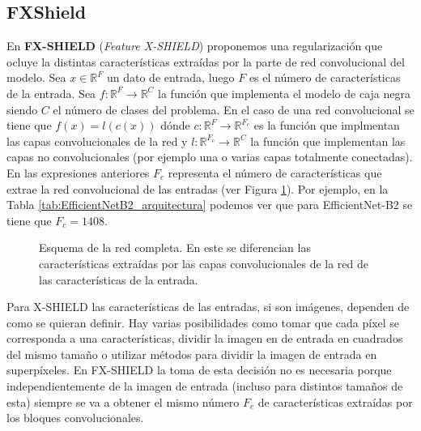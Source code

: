 \subsection{FXShield}

En \textbf{FX-SHIELD} (\textit{Feature X-SHIELD}) proponemos una regularización que ocluye la distintas características extraídas por la parte de red convolucional del modelo. Sea $x \in \mathbb{R}^F$ un dato de entrada, luego $F$ es el número de características de la entrada. Sea $f:\mathbb{R}^F \rightarrow \mathbb{R}^C$ la función que implementa el modelo de caja negra siendo $C$ el número de clases del problema. En el caso de una red convolucional se tiene que $f(x) = l(c(x))$ dónde $c:\mathbb{R}^F \rightarrow \mathbb{R}^{F_c}$ es la función que implmentan las capas convolucionales de la red y $l:\mathbb{R}^{F_c} \rightarrow \mathbb{R}^C$ la función que implementan las capas no convolucionales (por ejemplo una o varias capas totalmente conectadas). En las expresiones anteriores $F_c$ representa el número de características que extrae la red convolucional de las entradas (ver Figura \ref{fig:fxshield_esquema}). Por ejemplo, en la Tabla \ref{tab:EfficientNetB2_arquitectura} podemos ver que para EfficientNet-B2 se tiene que $F_c=1408$. 

\begin{figure}[h]
\noindent
{}
\caption{Esquema de la red completa. En este se diferencian las características extraídas por las capas convolucionales de la red de las características de la entrada.}
\label{fig:fxshield_esquema}
\end{figure}


Para X-SHIELD las características de las entradas, si son imágenes, dependen de como se quieran definir. Hay varias posibilidades como tomar que cada píxel se corresponda a una características, dividir la imagen en de entrada en cuadrados del mismo tamaño o utilizar métodos para dividir la imagen de entrada en superpíxeles. En FX-SHIELD la toma de esta decisión no es necesaria porque independientemente de la imagen de entrada (incluso para distintos tamaños de esta) siempre se va a obtener el mismo número $F_c$ de características extraídas por los bloques convolucionales. 

